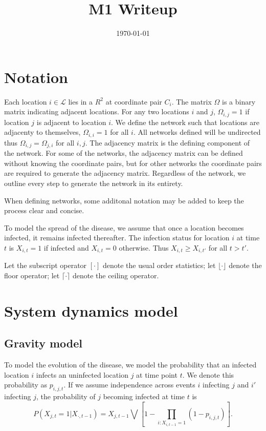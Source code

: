 \documentclass[11pt]{article}
\date{\today}
\title{M1 Writeup}
\begin{document}
\maketitle
\tableofcontents


\section{Notation}
\label{sec-1}

Each location $i \in \mathcal{L}$ lies in a $R^2$ at coordinate pair
$C_i$.  The matrix $\Omega$ is a binary matrix indicating adjacent
locations.  For any two locations $i$ and $j$, $\Omega_{i,j} = 1$ if
location $j$ is adjacent to location $i$.  We define the network such
that locations are adjacenty to themselves, $\Omega_{i,i} = 1$ for all
$i$.  All networks defined will be undirected thus $\Omega_{i,j} =
  \Omega_{j,i}$ for all $i,j$.  The adjacency matrix is the defining
component of the network.  For some of the networks, the adjacency
matrix can be defined without knowing the coordinate pairs, but for
other networks the coordinate pairs are required to generate the
adjacency matrix.  Regardless of the network, we outline every step to
generate the network in its entirety.

When defining networks, some additonal notation may be added to keep
the process clear and concise.

To model the spread of the disease, we assume that once a location
becomes infected, it remains infected thereafter.  The infection
status for location $i$ at time $t$ is $X_{i,t} = 1$ if infected and
$X_{i,t} = 0$ otherwise.  Thus $X_{i,t} \ge X_{i,t'}$ for all $t > t'$.

Let the subscript operator $[\cdot]$ denote the usual order
statistics; let $\lfloor \cdot \rfloor$ denote the floor operator; let
$\lceil \cdot \rceil$ denote the ceiling operator.


\section{System dynamics model}
\label{sec-2}

\subsection{Gravity model}
\label{sec-2-1}

To model the evolution of the disease, we model the probability that
an infected location $i$ infects an uninfected location $j$ at time
point $t$.  We denote this probability as $p_{i,j,t}$.  If we assume
independence across events $i$ infecting $j$ and $i'$ infecting $j$,
the probability of $j$ becoming infected at time $t$ is
\begin{equation*}
P(X_{j,t} = 1 | X_{\cdot,t-1}) = X_{j,t-1} \bigvee \left[1 - \prod_{i:
X_{i,t-1} = 1} ( 1 - p_{i,j,t} ) \right].
\end{equation*}
\end{document}
